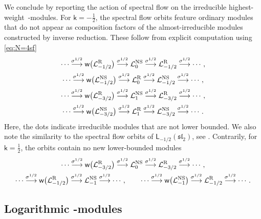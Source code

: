 \documentclass[pdftex]{sigma}
\numberwithin{equation}{section}
\newcommand{\kk}{\mathsf{k}} %
\newcommand{\NS}{\textnormal{NS}}
\newcommand{\R}{\textnormal{R}}
\DeclarePairedDelimiter{\brac}{\lparen}{\rparen} %
\newcommand{\lra}{\longrightarrow}
\newcommand{\alg}[1]{\mathfrak{#1}} %
\newcommand{\VOA}[1]{\mathsf{#1}} %
\newcommand{\Mod}[1]{\mathcal{#1}} %
\newcommand{\SLA}[2]{\alg{#1}_{#2}} %
\newcommand{\sltwo}{\SLA{sl}{2}}
\newcommand{\saff}[2]{\VOA{L}_{#1}(#2)} %
\newcommand{\ssl}[1][\kk]{\saff{#1}{\sltwo}} %
\newcommand{\swalg}[2]{\VOA{W}_{#1}^{\mathrm{#2}}} %
\newcommand{\smin}[1][\kk]{\swalg{#1}{min}} %
\newcommand{\sminpmhalf}{\smin[\pm 1/2]}
\newcommand{\nconjsymb}{\mathsf{w}} %
\newcommand{\nconj}{\nconjsymb \brac}
\newcommand{\nsfsymb}[1]{\sigma^{#1}} %
\newcommand{\nnsihw}[1]{\Mod{L}^{\NS}_{#1}} %
\newcommand{\nrihw}[1]{\Mod{L}^{\R}_{#1}}
\newcommand{\hw}{highest-weight}
\begin{document}
We conclude by reporting the action of spectral flow on the irreducible \hw\ \smash{$\sminpmhalf$}-modules.
For $\kk=-\frac{1}{2}$, the spectral flow orbits feature ordinary modules that do not appear as composition factors of the almost-irreducible modules constructed by inverse reduction.
These follow from explicit computation using \eqref{eq:N=4sf}
\begin{gather*}
\cdots \overset{\nsfsymb{1/2}}{\lra} \nconj[\big]{\nrihw{-1/2}} \overset{\nsfsymb{1/2}}{\lra} \nnsihw{0} \overset{\nsfsymb{1/2}}{\lra} \nrihw{-1/2} \overset{\nsfsymb{1/2}}{\lra} \cdots, \\
		\cdots \overset{\nsfsymb{1/2}}{\lra} \nconj[\big]{\nnsihw{-1/2}} \overset{\nsfsymb{1/2}}{\lra} \nrihw{0} \overset{\nsfsymb{1/2}}{\lra} \nnsihw{-1/2} \overset{\nsfsymb{1/2}}{\lra} \cdots, \\
		\cdots \overset{\nsfsymb{1/2}}{\lra} \nconj[\big]{\nrihw{-3/2}} \overset{\nsfsymb{1/2}}{\lra} \nnsihw{1} \overset{\nsfsymb{1/2}}{\lra} \nrihw{-3/2} \overset{\nsfsymb{1/2}}{\lra} \cdots, \\
		\cdots \overset{\nsfsymb{1/2}}{\lra} \nconj[\big]{\nnsihw{-3/2}} \overset{\nsfsymb{1/2}}{\lra} \nrihw{1} \overset{\nsfsymb{1/2}}{\lra} \nnsihw{-3/2} \overset{\nsfsymb{1/2}}{\lra} \cdots.
\end{gather*}
Here, the dots indicate irreducible modules that are not lower bounded.
We also note the similarity to the spectral flow orbits of $\ssl[-1/2]$, see \cite[Figure~3]{RidSL208}.
Contrarily, for $\kk=\frac{1}{2}$, the orbits contain no new lower-bounded modules
\begin{gather*}
		\cdots \overset{\nsfsymb{1/2}}{\lra} \nconj[\big]{\nrihw{-3/2}} \overset{\nsfsymb{1/2}}{\lra} \nnsihw{0} \overset{\nsfsymb{1/2}}{\lra} \nrihw{-3/2} \overset{\nsfsymb{1/2}}{\lra} \cdots, \\
		\cdots \overset{\nsfsymb{1/2}}{\lra} \nconj[\big]{\nrihw{-1/2}} \overset{\nsfsymb{1/2}}{\lra} \nnsihw{-1} \overset{\nsfsymb{1/2}}{\lra} \cdots, \qquad
		\cdots \overset{\nsfsymb{1/2}}{\lra} \nconj[\big]{\nnsihw{-1}} \overset{\nsfsymb{1/2}}{\lra} \nrihw{-1/2} \overset{\nsfsymb{1/2}}{\lra} \cdots.
	\end{gather*}

\subsection[Logarithmic sminpmhalf-modules]{Logarithmic \smash{$\boldsymbol{\sminpmhalf}$}-modules} \label{sec:k=+-1/2log}
\end{document}
